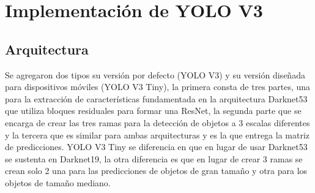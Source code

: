 \section{Implementación de YOLO V3}
\subsection{Arquitectura}
Se agregaron dos tipos su versión por defecto (YOLO V3) y su versión diseñada para dispositivos móviles (YOLO V3 Tiny), la primera consta de tres partes, una para la extracción de características fundamentada en la arquitectura Darknet53 \cite{yolov3} que utiliza bloques residuales para formar una ResNet, la segunda parte que se encarga de crear las tres ramas para la detección de objetos a 3 escalas diferentes y la tercera que es similar para ambas arquitecturas y es la que entrega la matriz de predicciones. YOLO V3 Tiny se diferencia en que en lugar de usar Darknet53 se sustenta en Darknet19, la otra diferencia es que en lugar de crear 3 ramas se crean solo 2 una para las predicciones de objetos de gran tamaño y otra para los objetos de tamaño mediano. 
